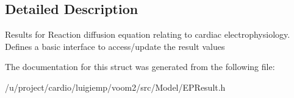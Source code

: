 \subsection{Detailed Description}
Results for Reaction diffusion equation relating to cardiac electrophysiology. Defines a basic interface to access/update the result values 

The documentation for this struct was generated from the following file:\begin{DoxyCompactItemize}
\item 
/u/project/cardio/luigiemp/voom2/src/Model/EPResult.h\end{DoxyCompactItemize}
